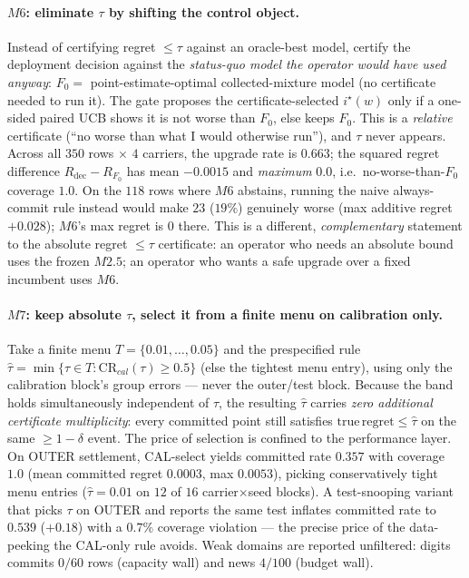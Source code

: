 \documentclass{article}
\begin{document}
\paragraph{$M6$: eliminate $\tau$ by shifting the control object.}
Instead of certifying regret $\le\tau$ against an oracle-best model, certify the
deployment decision against the \emph{status-quo model the operator would have used anyway}:
$F_0 = $ point-estimate-optimal collected-mixture model (no certificate needed to run it).
The gate proposes the certificate-selected $i^\star(w)$ only if a one-sided paired UCB
shows it is not worse than $F_0$, else keeps $F_0$. This is a \emph{relative} certificate
(``no worse than what I would otherwise run''), and $\tau$ never appears. Across all
$350$ rows $\times$ $4$ carriers, the upgrade rate is $0.663$; the squared regret
difference $R_{\mathrm{dec}}-R_{F_0}$ has mean $-0.0015$ and \emph{maximum} $0.0$, i.e.\
no-worse-than-$F_0$ coverage $1.0$. On the $118$ rows where $M6$ abstains, running the
naive always-commit rule instead would make $23$ ($19\%$) genuinely worse
(max additive regret $+0.028$); $M6$'s max regret is $0$ there. This is a different,
\emph{complementary} statement to the absolute regret $\le\tau$ certificate: an operator
who needs an absolute bound uses the frozen $M2.5$; an operator who wants a safe upgrade
over a fixed incumbent uses $M6$.

\paragraph{$M7$: keep absolute $\tau$, select it from a finite menu on calibration only.}
Take a finite menu $T=\{0.01,\dots,0.05\}$ and the prespecified rule
$\hat\tau=\min\{\tau\in T:\mathrm{CR}_{cal}(\tau)\ge0.5\}$ (else the tightest menu entry),
using only the calibration block's group errors --- never the outer/test block. Because the
band holds simultaneously independent of $\tau$, the resulting $\hat\tau$ carries \emph{zero
additional certificate multiplicity}: every committed point still satisfies
$\mathrm{true\,regret}\le\hat\tau$ on the same $\ge1-\delta$ event. The price of selection
is confined to the performance layer. On OUTER settlement, CAL-select yields committed rate
$0.357$ with coverage $1.0$ (mean committed regret $0.0003$, max $0.0053$), picking
conservatively tight menu entries ($\hat\tau{=}0.01$ on $12$ of $16$ carrier$\times$seed
blocks). A test-snooping variant that picks $\tau$ on OUTER and reports the same test
inflates committed rate to $0.539$ ($+0.18$) with a $0.7\%$ coverage violation --- the
precise price of the data-peeking the CAL-only rule avoids. Weak domains are reported
unfiltered: digits commits $0/60$ rows (capacity wall) and news $4/100$ (budget wall).
\end{document}
